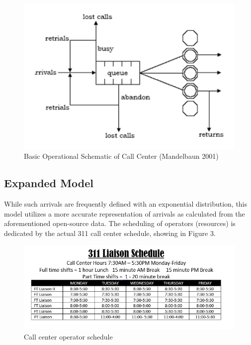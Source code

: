 \documentclass[12pt,twocolumn]{article}
\begin{document}
	\begin{figure}[h]
	\includegraphics[scale=.45]{call_center_layout.png}
	\caption{Basic Operational Schematic of Call Center (Mandelbaun 2001)}
	\end{figure}


\subsection{Expanded Model}

While such arrivals are frequently defined with an exponential distribution, this model utilizes a more accurate representation of arrivals as calculated from the aforementioned open-source data.  The scheduling of operators (resources) is dedicated by the actual 311 call center schedule, showing in Figure 3.

	\begin{figure}[h]
	\includegraphics[scale=.35]{schedule2.jpg}
	\caption{Call center operator schedule}
	\end{figure}  

\par
\end{document}
